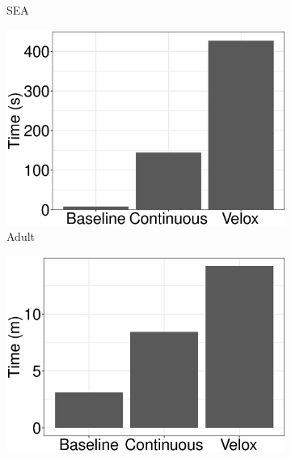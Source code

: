 \documentclass{vldb}
\begin{document}
\begin{figure}[h]
\begin{subfigure}[b]{0.2\textwidth}
	\caption{SEA}
	\label{fig:sea-times}
\end{subfigure}%
\begin{subfigure}[b]{0.2\textwidth}
	\includegraphics[width=\linewidth, height=\linewidth,keepaspectratio]{../images/experiment-results/adult-times.eps}
	\caption{Adult}
	\label{fig:adult-times}
\end{subfigure}%
\begin{subfigure}[b]{0.2\textwidth}
	\includegraphics[width=\linewidth, height=\linewidth,keepaspectratio]{../images/experiment-results/movie-lens-100k-times.eps}

\end{subfigure}
\end{figure}
\end{document}
